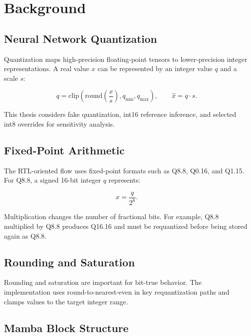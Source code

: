 \chapter{Background}
\label{ch:background}

\section{Neural Network Quantization}

Quantization maps high-precision floating-point tensors to lower-precision integer representations. A real value $x$ can be represented by an integer value $q$ and a scale $s$:

\begin{equation}
  q = \mathrm{clip}\left(\mathrm{round}\left(\frac{x}{s}\right), q_{\min}, q_{\max}\right),
  \qquad
  \hat{x} = q \cdot s.
\end{equation}

This thesis considers fake quantization, int16 reference inference, and selected int8 overrides for sensitivity analysis.

\section{Fixed-Point Arithmetic}

The RTL-oriented flow uses fixed-point formats such as Q8.8, Q0.16, and Q1.15. For Q8.8, a signed 16-bit integer $q$ represents:

\begin{equation}
  x = \frac{q}{2^8}.
\end{equation}

Multiplication changes the number of fractional bits. For example, Q8.8 multiplied by Q8.8 produces Q16.16 and must be requantized before being stored again as Q8.8.

\section{Rounding and Saturation}

Rounding and saturation are important for bit-true behavior. The implementation uses round-to-nearest-even in key requantization paths and clamps values to the target integer range.

\section{Mamba Block Structure}


